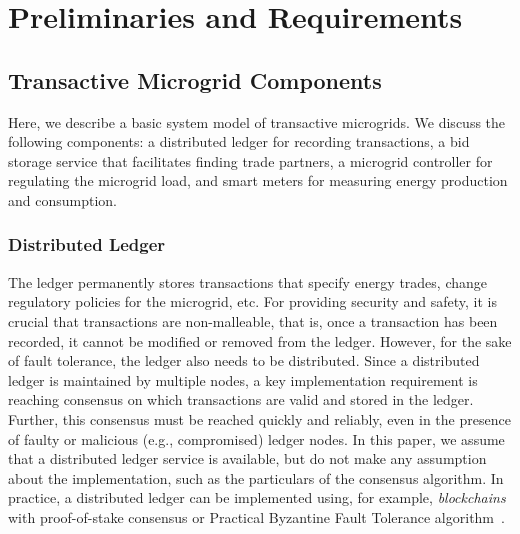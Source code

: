 \section{Preliminaries and Requirements}

\subsection{Transactive Microgrid Components}

Here, we describe a basic system model of transactive microgrids.
We discuss the following components: a distributed ledger for recording transactions, a bid storage service that facilitates finding trade partners, a microgrid controller for regulating the microgrid load, and smart meters for measuring energy production and consumption.

\subsubsection{Distributed Ledger}
The ledger permanently stores transactions that specify energy trades, change regulatory policies for the microgrid, etc.
For providing security and safety, it is crucial that transactions are non-malleable, that is, once a transaction has been recorded, it cannot be modified or removed from the ledger.
However, for the sake of fault tolerance, the ledger also needs to be distributed.
Since a distributed ledger is maintained by multiple nodes, a key implementation requirement is reaching consensus on which transactions are valid and stored in the ledger.
Further, this consensus must be reached quickly and reliably, even in the presence of faulty or malicious (e.g., compromised) ledger nodes.
In this paper, we assume that a distributed ledger service is available, but do not make any assumption about the implementation, such as the particulars of the consensus algorithm.
In practice, a distributed ledger can be implemented using, for example, \emph{blockchains} with proof-of-stake consensus or Practical Byzantine Fault Tolerance algorithm~\cite{castro1999practical}.

